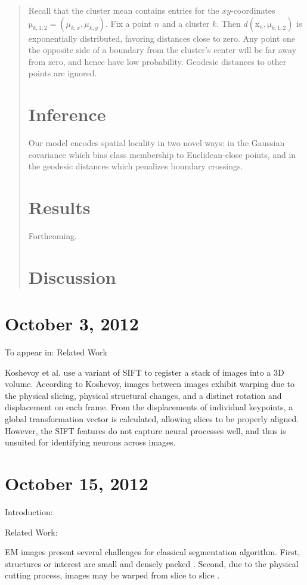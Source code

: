 \documentclass[draft,english]{article}
\newcommand{\+}[1]{\ensuremath{\boldsymbol{\mathrm{#1}}}}
\begin{document}
\begin{abstract}
Recall that the cluster mean contains entries for the $xy$-coordinates $\+{\mu}_{k,1:2} = (\mu_{k,x}, \mu_{k,y})$. Fix a point $n$ and a cluster $k$. Then $d(\+{x}_n, \+{\mu}_{k,1:2})$ is exponentially distributed, favoring distances close to zero. Any point one the opposite side of a boundary from the cluster's center will be far away from zero, and hence have low probability. Geodesic distances to other points are ignored.

\section{Inference}
Our model encodes spatial locality in two novel ways: in the Gaussian covariance which bias class membership to Euclidean-close points, and in the geodesic distances which penalizes boundary crossings.

\section{Results}
Forthcoming.

\section{Discussion}

\end{abstract}
\section*{October 3, 2012}
To appear in: Related Work


Koshevoy et al. \cite{Koshevoy2006} use a variant of SIFT \cite{Lowe2004} to register a stack of images into a 3D volume. According to Koshevoy, images between images exhibit warping due to the physical slicing, physical structural changes, and a distinct rotation and displacement on each frame. From the displacements of individual keypoints, a global transformation vector is calculated, allowing slices to be properly aligned. However, the SIFT features do not capture neural processes well, and thus is unsuited for identifying neurons across images.

\section*{October 15, 2012}
Introduction:

Related Work:

EM images present several challenges for classical segmentation algorithm. First, structures or interest are small and densely packed \cite{Jain2007}. Second, due to the physical cutting process, images may be warped from slice to slice \cite{Koshevoy2006}.
\end{document}
